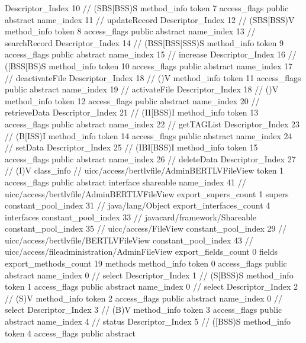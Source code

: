 {{{{{					Descriptor_Index	10		// (SBS[BSS)S
				}
				method_info {
					token	7
					access_flags	public abstract
					name_index	11		// updateRecord
					Descriptor_Index	12		// (SBS[BSS)V
				}
				method_info {
					token	8
					access_flags	public abstract
					name_index	13		// searchRecord
					Descriptor_Index	14		// (BSS[BSS[SSS)S
				}
				method_info {
					token	9
					access_flags	public abstract
					name_index	15		// increase
					Descriptor_Index	16		// ([BSS[BS)S
				}
				method_info {
					token	10
					access_flags	public abstract
					name_index	17		// deactivateFile
					Descriptor_Index	18		// ()V
				}
				method_info {
					token	11
					access_flags	public abstract
					name_index	19		// activateFile
					Descriptor_Index	18		// ()V
				}
				method_info {
					token	12
					access_flags	public abstract
					name_index	20		// retrieveData
					Descriptor_Index	21		// (II[BSS)I
				}
				method_info {
					token	13
					access_flags	public abstract
					name_index	22		// getTAGList
					Descriptor_Index	23		// (B[ISS)I
				}
				method_info {
					token	14
					access_flags	public abstract
					name_index	24		// setData
					Descriptor_Index	25		// (IBI[BSS)I
				}
				method_info {
					token	15
					access_flags	public abstract
					name_index	26		// deleteData
					Descriptor_Index	27		// (I)V
				}
			}
		}
		class_info {		// uicc/access/bertlvfile/AdminBERTLVFileView
			token	1
			access_flags	public abstract interface shareable
			name_index	41		// uicc/access/bertlvfile/AdminBERTLVFileView
			export_supers_count	1
			supers {
				constant_pool_index	31		// java/lang/Object
			}
			export_interfaces_count	4
			interfaces {
				constant_pool_index	33		// javacard/framework/Shareable
				constant_pool_index	35		// uicc/access/FileView
				constant_pool_index	29		// uicc/access/bertlvfile/BERTLVFileView
				constant_pool_index	43		// uicc/access/fileadministration/AdminFileView
			}
			export_fields_count	0
			fields {
			}
			export_methods_count	19
			methods {
				method_info {
					token	0
					access_flags	public abstract
					name_index	0		// select
					Descriptor_Index	1		// (S[BSS)S
				}
				method_info {
					token	1
					access_flags	public abstract
					name_index	0		// select
					Descriptor_Index	2		// (S)V
				}
				method_info {
					token	2
					access_flags	public abstract
					name_index	0		// select
					Descriptor_Index	3		// (B)V
				}
				method_info {
					token	3
					access_flags	public abstract
					name_index	4		// status
					Descriptor_Index	5		// ([BSS)S
				}
				method_info {
					token	4
					access_flags	public abstract
}}}}}

